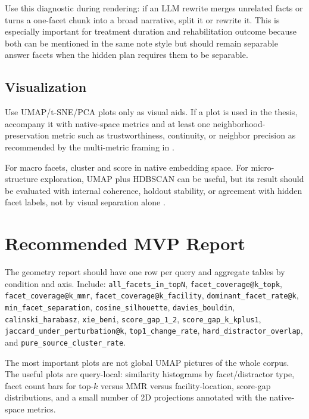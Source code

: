 \documentclass[11pt,a4paper]{article}
\newcommand{\field}[1]{\texttt{#1}}
\begin{document}
Use this diagnostic during rendering: if an LLM rewrite merges unrelated facts or turns a one-facet chunk into a broad narrative, split it or rewrite it. This is especially important for treatment duration and rehabilitation outcome because both can be mentioned in the same note style but should remain separable answer facets when the hidden plan requires them to be separable.

\subsection{Visualization}

Use UMAP/t-SNE/PCA plots only as visual aids. If a plot is used in the thesis, accompany it with native-space metrics and at least one neighborhood-preservation metric such as trustworthiness, continuity, or neighbor precision as recommended by the multi-metric framing in \citet{inkiriwangWeReallyNeed2025}.

For macro facets, cluster and score in native embedding space. For micro-structure exploration, UMAP plus HDBSCAN can be useful, but its result should be evaluated with internal coherence, holdout stability, or agreement with hidden facet labels, not by visual separation alone \citep{pavonIntrinsicThematicSeparability2026}.

\section{Recommended MVP Report}

The geometry report should have one row per query and aggregate tables by condition and axis. Include: \field{all\_facets\_in\_topN}, \field{facet\_coverage@k\_topk}, \field{facet\_coverage@k\_mmr}, \field{facet\_coverage@k\_facility}, \field{dominant\_facet\_rate@k}, \field{min\_facet\_separation}, \field{cosine\_silhouette}, \field{davies\_bouldin}, \field{calinski\_harabasz}, \field{xie\_beni}, \field{score\_gap\_1\_2}, \field{score\_gap\_k\_kplus1}, \field{jaccard\_under\_perturbation@k}, \field{top1\_change\_rate}, \field{hard\_distractor\_overlap}, and \field{pure\_source\_cluster\_rate}.

The most important plots are not global UMAP pictures of the whole corpus. The useful plots are query-local: similarity histograms by facet/distractor type, facet count bars for top-$k$ versus MMR versus facility-location, score-gap distributions, and a small number of 2D projections annotated with the native-space metrics.
\end{document}
